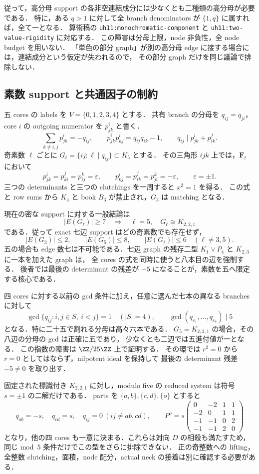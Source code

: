 従って，高分母 support の各非空連結成分には少なくとも二種類の高分母が必要である．
特に，ある $q>1$ に対して全 branch denominators が $\{1,q\}$ に属すれば，全て一となる．
算術稿の \texttt{uh11:monochromatic-component} と
\texttt{uh11:two-value-rigidity} に対応する．
この障害は分母上限，node 非負性，全 node budget を用いない．
「単色の部分 graph」が別の高分母 edge に接する場合には，連結成分という仮定が失われるので，
その部分 graph だけを同じ議論で排除しない．

\subsection{素数 support と共通因子の制約}

五 cores の labels を $V=\{0,1,2,3,4\}$ とする．
共有 branch の分母を $q_{ij}=q_{ji}$，core $i$ の outgoing numerator を $p^i_{jk}$ と書く．
\[
 \sum_{k\ne i,j}p^i_{jk}=-q_{ij},\qquad
 p^i_{jk}p^i_{kj}=q_{ij}q_{ik}-1,\qquad
 q_{ij}\mid p^i_{jk}+p^j_{ik}.
\]
奇素数 $\ell$ ごとに $G_\ell=\{ij:\ell\mid q_{ij}\}\subset K_5$ とする．
その三角形 $ijk$ 上では，$\mathbf F_\ell$ において
\[
 p^i_{jk}=p^j_{ki}=p^k_{ij}=\varepsilon,\qquad
 p^i_{kj}=p^j_{ik}=p^k_{ji}=-\varepsilon,
 \qquad\varepsilon=\pm1.
\]
三つの determinants と三つの clutchings を一周すると $x^2=1$ を得る．
この式と row sums から $K_4$ と book $B_3$ が禁止され，$G_3$ は matching となる．

現在の密な support に対する一般結論は
\[
 |E(G_\ell)|\geq7
 \quad\Longrightarrow\quad
 \ell=5,\quad G_\ell\cong K_{2,2,1}
\]
である．従って exact 七辺 support はどの奇素数でも存在せず，
\[
 |E(G_3)|\leq2,\qquad |E(G_5)|\leq8,\qquad
 |E(G_\ell)|\leq6\quad(\ell\ne3,5).
\]
五の場合も edge 数七は不可能である．七辺 graph の残存二型
$K_1\vee P_4$ と $K_{2,3}$ に一本を加えた graph は，
全 cores の式を同時に使うと八本目の辺を強制する．
後者では最後の determinant の残差が $-5$ になることが，素数を五へ限定する核心である．

四 cores に対する以前の gcd 条件に加え，任意に選んだ七本の異なる branches に対して
\[
 \gcd\{q_{ij}:i,j\in S,\ i<j\}=1\quad(|S|=4),
 \qquad
 \gcd(q_{e_1},\ldots,q_{e_7})\mid5
\]
となる．特に二十五で割れる分母は高々六本である．
$G_5=K_{2,2,1}$ の場合，その八辺の分母の gcd は正確に五であり，
少なくとも二辺では五進付値が一となる．
この指数の障害は $\ZZ/25\ZZ$ 上で証明する．
その環では $r^2=0$ から $r=0$ としてはならず，nilpotent ideal を保持して
最後の determinant 残差 $-5\ne0$ を取り出す．

固定された標識付き $K_{2,2,1}$ に対し，modulo five の reduced system は符号 $s=\pm1$ の二解だけである．
parts を $\{a,b\},\{c,d\},\{o\}$ とすると
\[
 q_{ab}=-s,\quad q_{cd}=s,\quad q_{ij}=0\ (ij\ne ab,cd),
 \qquad
 P^o=s\begin{pmatrix}
 0&-2&1&1\\-2&0&1&1\\-1&-1&0&2\\-1&-1&2&0
 \end{pmatrix}
\]
となり，他の四 cores も一意に決まる．これらは対向 $D$ の相殺も満たすため，
同じ mod~$5$ 条件だけでこの型をさらに排除できない．
正の奇整数への lifting，全整数 clutching，面積，node 配分，actual neck の接着は別に確認する必要がある．

